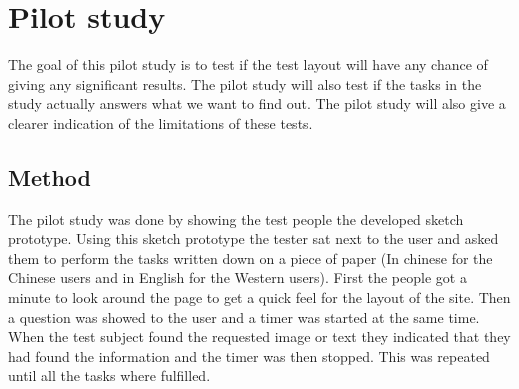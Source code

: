 
\chapter{Pilot study} %

\label{Pilotstudy} %

The goal of this pilot study is to test if the test layout will have any chance of giving any significant results. The pilot study will also test if the tasks in the study actually answers what we want to find out. The pilot study will also give a clearer indication of the limitations of these tests.
\section{Method}
The pilot study was done by showing the test people the developed sketch prototype. Using this sketch prototype the tester sat next to the user and asked them to perform the tasks written down on a piece of paper (In chinese for the Chinese users and in English for the Western users). First the people got a minute to look around the page to get a quick feel for the layout of the site. Then a question was showed to the user and a timer was started at the same time. When the test subject found the requested image or text they indicated that they had found the information and the timer was then stopped. This was repeated until all the tasks where fulfilled.


